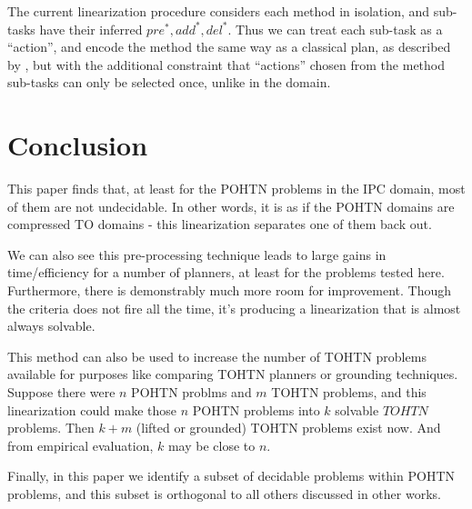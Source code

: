 \documentclass[letterpaper]{article} %
\newcommand{\PreS} {\ensuremath{\mathit{pre^{*}}}}
\newcommand{\AddS} {\ensuremath{\mathit{add^{*}}}}
\newcommand{\DelS} {\ensuremath{\mathit{del^{*}}}}
\begin{document}
The current linearization procedure considers each method in isolation, and sub-tasks have their inferred $\PreS, \AddS, \DelS$. Thus we can treat each sub-task as a \enquote{action}, and encode the method the same way as a classical plan, as described by \cite{RINTANEN201245}, but with the additional constraint that \enquote{actions} chosen from the method sub-tasks can only be selected once, unlike in the domain.







\section{Conclusion}


This paper finds that, at least for the POHTN problems in the IPC domain, most of them are not undecidable. In other words, it is as if the POHTN domains are compressed TO domains - this linearization separates one of them back out.

We can also see this pre-processing technique leads to large gains in time/efficiency for a number of planners, at least for the problems tested here. Furthermore, there is demonstrably much more room for improvement. Though the criteria does not fire all the time, it's producing a linearization that is almost always solvable.

This method can also be used to increase the number of TOHTN problems available for purposes like comparing TOHTN planners or grounding techniques. Suppose there were $n$ POHTN problms and $m$ TOHTN problems, and this linearization could make those $n$ POHTN problems into $k$ solvable $TOHTN$ problems. Then $k+m$ (lifted or grounded) TOHTN problems exist now. And from empirical evaluation, $k$ may be close to $n$.

Finally, in this paper we identify a subset of decidable problems within POHTN problems, and this subset is orthogonal to all others discussed in other works.










\end{document}
